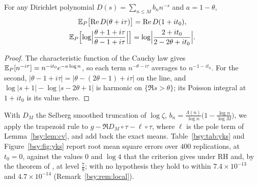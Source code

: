 \begin{lemma}\label{bsy:lem:cv}
For any Dirichlet polynomial $D(s)=\sum_{n\le M}b_nn^{-s}$ and $a=1-\theta$,
\[
\begin{gathered}
\mathbb{E}_P\bigl[\operatorname{Re} D(\theta+i\tau)\bigr]=\operatorname{Re} D(1+it_0),\\
\mathbb{E}_P\Bigl[\log\Bigl|\frac{\theta+1+i\tau}{\theta-1+i\tau}\Bigr|\Bigr]=\log\Bigl|\frac{2+it_0}{2-2\theta+it_0}\Bigr| .
\end{gathered}
\]
\end{lemma}

\begin{proof}
The characteristic function of the Cauchy law gives $\mathbb{E}_P[n^{-i\tau}]=n^{-it_0}e^{-a\log n}$, so each term $n^{-\theta-i\tau}$ averages to $n^{-1-it_0}$. For the second, $|\theta-1+i\tau|=|\theta-(2\theta-1)+i\tau|$ on the line, and $\log|s+1|-\log|s-2\theta+1|$ is harmonic on $\{\Re s>\theta\}$; its Poisson integral at $1+it_0$ is its value there.
\end{proof}

With $D_M$ the Selberg smoothed truncation of $\log\zeta$, $b_n=\frac{\Lambda(n)}{\log n}\bigl(1-\frac{\log n}{\log M}\bigr)$, we apply the trapezoid rule to $g-\Re D_M\circ\tau-\ell\circ\tau$, where $\ell$ is the pole term of Lemma~\ref{bsy:lem:cv}, and add back the exact means. Table~\ref{bsy:tab:yks} and Figure~\ref{bsy:fig:yks} report root mean square errors over $400$ replications, at $t_0=0$, against the values $0$ and $\log4$ that the criterion gives under RH and, by the theorem of \cite{OAI26a}, at level $\frac78$; with no hypothesis they hold to within $7.4\times10^{-13}$ and $4.7\times10^{-14}$ (Remark~\ref{bsy:rem:local}).

